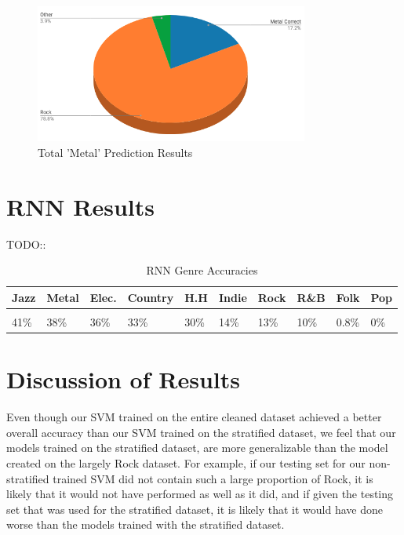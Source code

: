 \documentclass[journal]{IEEEtran}
\begin{document}
\begin{figure}[h!]
\centering
\includegraphics[width=9cm]{Figure_3}
\caption{Total 'Metal' Prediction Results}
\end{figure}

\newpage
\section{RNN Results}

TODO::

\begin{table}[h!]
    \label{tab:table1}
    \caption{RNN Genre Accuracies}
    \begin{tabular}{|m{0.4cm}|m{0.5cm}|m{0.4cm}|m{0.5cm}|m{0.4cm}|m{0.4cm}|m{0.45cm}|m{0.4cm}|m{0.4cm}|m{0.4cm}}
    \textbf{Jazz} & \textbf{Metal} & \textbf{Elec.} & \textbf{Country} & \textbf{H.H} & \textbf{Indie} & \textbf{Rock} & \textbf{R\&B} & \textbf{Folk} & \textbf{Pop}\\
      \hline
      \\
	41\% & 38\% & 36\%& 33\% & 30\% & 14\% & 13\% & 10\% & 0.8\% & 0\%\\

    \end{tabular}
\end{table}

\section{Discussion of Results}

Even though our SVM trained on the entire cleaned dataset achieved a better overall accuracy than our SVM trained on the stratified dataset, we feel that our models trained on the stratified dataset, are more generalizable than the model created on the largely Rock dataset. For example, if our testing set for our non-stratified trained SVM did not contain such a large proportion of Rock, it is likely that it would not have performed as well as it did, and if given the testing set that was used for the stratified dataset, it is likely that it would have done worse than the models trained with the stratified dataset.
\end{document}
